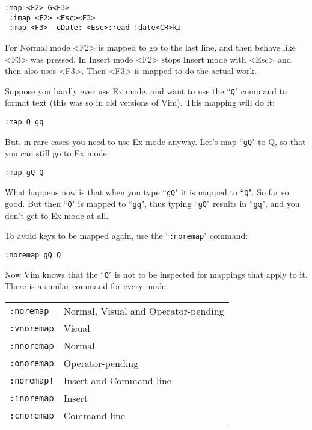 \begin{Verbatim}[samepage=true]
 :map <F2> G<F3>
 :imap <F2> <Esc><F3>
 :map <F3>  oDate: <Esc>:read !date<CR>kJ
\end{Verbatim}

For Normal mode <F2> is mapped to go to the last line, and then behave like <F3> was pressed.
In Insert mode <F2> stops Insert mode with <Esc> and then also uses <F3>.
Then <F3> is mapped to do the actual work.

Suppose you hardly ever use Ex mode, and want to use the ``\texttt{Q}" command to format text (this was so in old versions of Vim).
This mapping will do it:

\begin{Verbatim}[samepage=true]
 :map Q gq
\end{Verbatim}

But, in rare cases you need to use Ex mode anyway.
Let's map ``\texttt{gQ}" to Q, so that you can still go to Ex mode:

\begin{Verbatim}[samepage=true]
 :map gQ Q
\end{Verbatim}

What happens now is that when you type ``\texttt{gQ}" it is mapped to ``\texttt{Q}".
So far so good.
But then ``\texttt{Q}" is mapped to ``\texttt{gq}", thus typing ``\texttt{gQ}" results in ``\texttt{gq}", and you don't get to Ex mode at all.

To avoid keys to be mapped again, use the ``\texttt{:noremap}" command:

\begin{Verbatim}[samepage=true]
 :noremap gQ Q
\end{Verbatim}

Now Vim knows that the ``\texttt{Q}" is not to be inspected for mappings that apply to it.
There is a similar command for every mode:

\begin{center} \begin{tabular}{l l}
				\texttt{:noremap} & Normal, Visual and Operator-pending \\
				\texttt{:vnoremap} & Visual \\
				\texttt{:nnoremap} & Normal \\
				\texttt{:onoremap} & Operator-pending \\
				\texttt{:noremap!} & Insert and Command-line \\
				\texttt{:inoremap} & Insert \\
				\texttt{:cnoremap} & Command-line \\
\end{tabular} \end{center}

